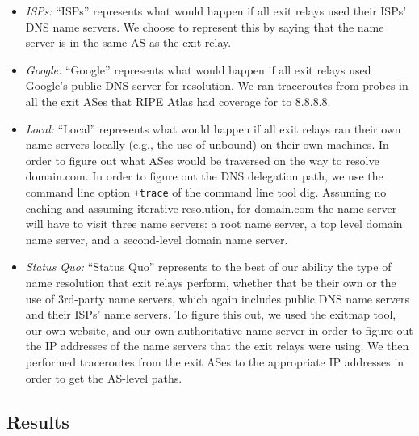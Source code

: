 \begin{itemize}
    \item \emph{ISPs:} ``ISPs'' represents what would happen if all exit relays used their ISPs' DNS name 
servers.  We choose to represent this by saying that the name server is in the same AS as the 
exit relay.

    \item \emph{Google:} ``Google'' represents what would happen if all exit relays used 
Google's public DNS server for resolution. We ran traceroutes from probes in all the exit 
ASes that RIPE Atlas had coverage for to 8.8.8.8.

    \item \emph{Local:} ``Local'' represents what would happen if all exit relays ran their own name 
servers locally (e.g., the use of unbound) on their own machines. In order to figure out 
what ASes would be traversed on the way to resolve domain.com. In order to figure out the 
DNS delegation path, we use the command line option \texttt{+trace} of the
command line tool dig. Assuming no caching and assuming 
iterative resolution, for domain.com the name server will have to visit three name servers:
a root name server, a top level domain name server, and a second-level domain name server. 

    \item \emph{Status Quo:} ``Status Quo'' represents to the best of our ability the type of name resolution 
that exit relays perform, whether that be their own or the use of 3rd-party name servers, 
which again includes public DNS name servers and their ISPs' name servers. To figure this 
out, we used the exitmap tool, our own website, and our own authoritative name server 
in order to figure out the IP addresses of the name servers that the exit relays were 
using. We then performed traceroutes from the exit ASes to the appropriate IP addresses 
in order to get the AS-level paths.
\end{itemize}

\subsection{Results}

